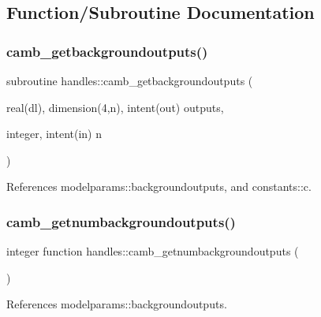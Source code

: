 \subsection{Function/\+Subroutine Documentation}
\mbox{\label{namespacehandles_a8c6d226c983d217554ce7208a52f6684}} 
\subsubsection{\texorpdfstring{camb\+\_\+getbackgroundoutputs()}{camb\_getbackgroundoutputs()}}
{\footnotesize\ttfamily subroutine handles\+::camb\+\_\+getbackgroundoutputs (\begin{DoxyParamCaption}\item[{real(dl), dimension(4,n), intent(out)}]{outputs,  }\item[{integer, intent(in)}]{n }\end{DoxyParamCaption})}



References modelparams\+::backgroundoutputs, and constants\+::c.

\mbox{\label{namespacehandles_a67c4066d5a6fa655910d3dc0fc295419}} 
\subsubsection{\texorpdfstring{camb\+\_\+getnumbackgroundoutputs()}{camb\_getnumbackgroundoutputs()}}
{\footnotesize\ttfamily integer function handles\+::camb\+\_\+getnumbackgroundoutputs (\begin{DoxyParamCaption}{ }\end{DoxyParamCaption})}



References modelparams\+::backgroundoutputs.

\mbox{\label{namespacehandles_a694425016cc091db331b30804819bca8}} 
